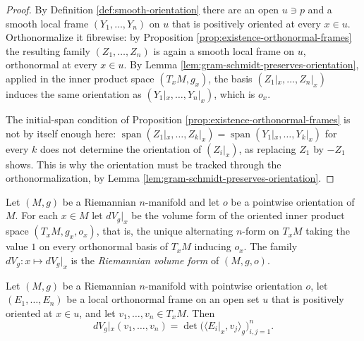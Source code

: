 \begin{proof}
\leanok
{}
By Definition \ref{def:smooth-orientation} there are an open $u \ni p$ and a smooth local frame
$(Y_1, \ldots, Y_n)$ on $u$ that is positively oriented at every $x \in u$. Orthonormalize it
fibrewise: by Proposition \ref{prop:existence-orthonormal-frames} the resulting family
$(Z_1, \ldots, Z_n)$ is again a smooth local frame on $u$, orthonormal at every $x \in u$. By
Lemma \ref{lem:gram-schmidt-preserves-orientation}, applied in the inner product space
$(T_x M, g_x)$, the basis $(Z_1|_x, \ldots, Z_n|_x)$ induces the same orientation as
$(Y_1|_x, \ldots, Y_n|_x)$, which is $o_x$.

The initial-span condition of Proposition \ref{prop:existence-orthonormal-frames} is not by
itself enough here: $\operatorname{span}(Z_1|_x, \ldots, Z_k|_x) =
\operatorname{span}(Y_1|_x, \ldots, Y_k|_x)$ for every $k$ does not determine the orientation of
$(Z_i|_x)$, as replacing $Z_1$ by $-Z_1$ shows. This is why the orientation must be tracked
through the orthonormalization, by Lemma \ref{lem:gram-schmidt-preserves-orientation}.
\end{proof}

\begin{definition}
\label{def:volume-form-pointwise}
\leanok
{}
Let $(M,g)$ be a Riemannian $n$-manifold and let $o$ be a pointwise orientation of $M$. For each
$x \in M$ let $dV_g|_x$ be the volume form of the oriented inner product space
$(T_x M, g_x, o_x)$, that is, the unique alternating $n$-form on $T_x M$ taking the value $1$ on
every orthonormal basis of $T_x M$ inducing $o_x$. The family $dV_g : x \mapsto dV_g|_x$ is the
\emph{Riemannian volume form} of $(M, g, o)$.
\end{definition}

\begin{proposition}
\label{prop:volume-form-determinant}
\leanok
{}
Let $(M,g)$ be a Riemannian $n$-manifold with pointwise orientation $o$, let $(E_1,\ldots,E_n)$
be a local orthonormal frame on an open set $u$ that is positively oriented at $x \in u$, and let
$v_1, \ldots, v_n \in T_x M$. Then
\[
dV_g|_x(v_1, \ldots, v_n) = \det \bigl( \langle E_i|_x, v_j \rangle_g \bigr)_{i,j=1}^{n}.
\]
\end{proposition}

